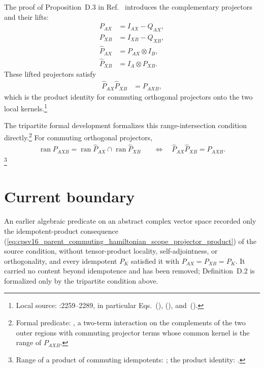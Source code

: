 \documentclass{article}
\begin{document}
The proof of Proposition~D.3 in Ref.~\cite{Cirac2016MPDO_arXiv} introduces the
complementary projectors and their lifts:
\begin{align}
    P_{AX}
        &=I_{AX}-Q_{AX},
    \label{eq:cpsv16_parent_commuting_hamiltonian_scope_pax_complement}\\
    P_{XB}
        &=I_{XB}-Q_{XB},
    \label{eq:cpsv16_parent_commuting_hamiltonian_scope_pxb_complement}\\
    \widehat P_{AX}
        &=P_{AX}\otimes I_B,
    \label{eq:cpsv16_parent_commuting_hamiltonian_scope_pax_lift}\\
    \widehat P_{XB}
        &=I_A\otimes P_{XB}.
    \label{eq:cpsv16_parent_commuting_hamiltonian_scope_pxb_lift}
\end{align}
These lifted projectors satisfy
\begin{align}
    \widehat P_{AX}\widehat P_{XB}
        &=P_{AXB},
    \label{eq:cpsv16_parent_commuting_hamiltonian_scope_projector_product}
\end{align}
which is the product identity for commuting orthogonal projectors onto the two
local kernels.\footnote{Local source:
:2259--2289, in particular
Eqs.~(), (), and~().}

The tripartite formal development formalizes this range-intersection
condition directly.\footnote{Formal predicate:
, a two-term interaction on the
complements of the two outer regions with commuting projector terms whose
common kernel is the range of $P_{AXB}$.} For commuting
orthogonal projectors,
\begin{align}
    \operatorname{ran}P_{AXB}
        =\operatorname{ran}\widehat P_{AX}
          \cap\operatorname{ran}\widehat P_{XB}
        \quad&\Longleftrightarrow\quad
        \widehat P_{AX}\widehat P_{XB}=P_{AXB}.
    \label{eq:cpsv16_parent_commuting_hamiltonian_scope_range_product_equivalence}
\end{align}
\footnote{Range of a product of commuting idempotents:
; the product identity:
.}

\section{Current boundary}

An earlier algebraic predicate on an abstract complex vector space recorded
only the idempotent-product consequence
(\ref{eq:cpsv16_parent_commuting_hamiltonian_scope_projector_product}) of the
source condition, without tensor-product locality, self-adjointness, or
orthogonality, and every idempotent $P_K$ satisfied it with
$P_{AX}=P_{XB}=P_K$. It carried no content beyond idempotence and has been
removed; Definition~D.2 is formalized only by the tripartite condition above.
\end{document}
